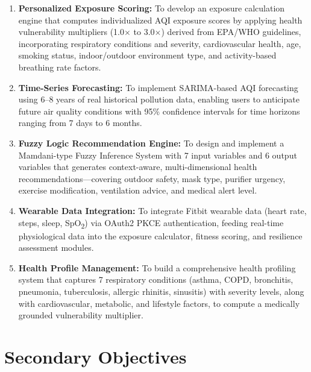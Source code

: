 \documentclass[12pt,a4paper]{report}
\begin{document}
\begin{enumerate}[leftmargin=*]
  \item \textbf{Personalized Exposure Scoring:} To develop an exposure calculation engine that computes individualized AQI exposure scores by applying health vulnerability multipliers (1.0$\times$ to 3.0$\times$) derived from EPA/WHO guidelines, incorporating respiratory conditions and severity, cardiovascular health, age, smoking status, indoor/outdoor environment type, and activity-based breathing rate factors.

  \item \textbf{Time-Series Forecasting:} To implement SARIMA-based AQI forecasting using 6--8 years of real historical pollution data, enabling users to anticipate future air quality conditions with 95\% confidence intervals for time horizons ranging from 7 days to 6 months.

  \item \textbf{Fuzzy Logic Recommendation Engine:} To design and implement a Mamdani-type Fuzzy Inference System with 7 input variables and 6 output variables that generates context-aware, multi-dimensional health recommendations---covering outdoor safety, mask type, purifier urgency, exercise modification, ventilation advice, and medical alert level.

  \item \textbf{Wearable Data Integration:} To integrate Fitbit wearable data (heart rate, steps, sleep, SpO\textsubscript{2}) via OAuth2 PKCE authentication, feeding real-time physiological data into the exposure calculator, fitness scoring, and resilience assessment modules.

  \item \textbf{Health Profile Management:} To build a comprehensive health profiling system that captures 7 respiratory conditions (asthma, COPD, bronchitis, pneumonia, tuberculosis, allergic rhinitis, sinusitis) with severity levels, along with cardiovascular, metabolic, and lifestyle factors, to compute a medically grounded vulnerability multiplier.
\end{enumerate}

\section{Secondary Objectives}
\end{document}
